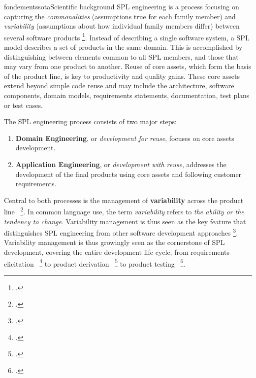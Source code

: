 \documentclass{ra2018}
\begin{document}
\begin{module}{fondements}{sota}{Scientific background}
SPL engineering is a process focusing on capturing the \textit{commonalities}
(assumptions true for each family member) and \textit{variability}
(assumptions about how individual family members differ) between several
software products   \footcite{Coplien1998}. Instead of describing a single software
system, a SPL model describes a set of products in the same domain. This is
accomplished by distinguishing between elements common to all SPL members, and
those that may vary from one product to another. Reuse of core assets, which
form the basis of the product line, is key to productivity and quality
gains. These core assets extend beyond simple code reuse and may include the
architecture, software components, domain models, requirements statements,
documentation, test plans or test cases.


The SPL engineering process consists of two major steps:
\begin{enumerate}
\item \textbf{Domain Engineering}, or \emph{development for reuse}, focuses on
core assets development.
\item \textbf{Application Engineering}, or \emph{development with reuse},
addresses the development of the final products using core assets and
following customer requirements.
\end{enumerate}

Central to both processes is the management of \textbf{variability} across
the product line~  \footcite{halmans2003}. In common language use, the term
\textit{variability} refers to \textit{the ability or the tendency to
change}. Variability management is thus seen as the key feature that
distinguishes SPL engineering from other software development approaches
  \footcite{Bosch2002}. Variability management is thus growingly seen as the
cornerstone of SPL development, covering the entire development life cycle,
from requirements elicitation~  \footcite{Jean-ChristopheTRIGAUX2003} to product
derivation~  \footcite{Ziadi2006a} to product testing~  \footcite{nebut03b,Nebut06b}. 
 


\end{module}
\end{document}
